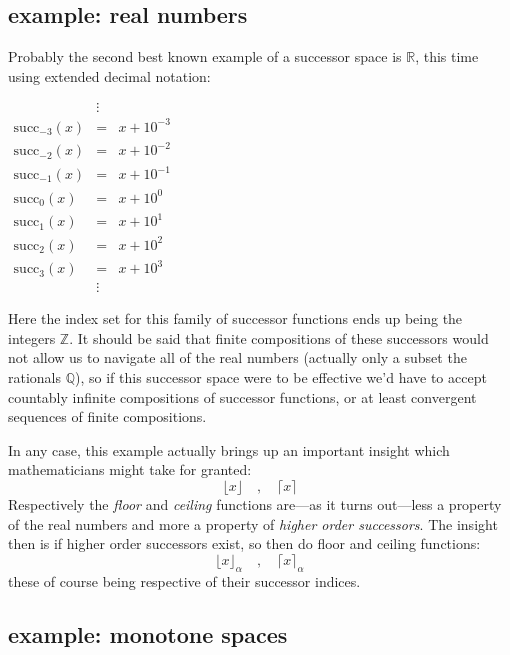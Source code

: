 \documentclass[twoside]{article}
\begin{document}
\subsection*{example: real numbers}

Probably the second best known example of a successor space is $ \mathbb{R} $, this time using extended decimal notation:

\begin{center}
$ \begin{array}{rcl}
			& \vdots	&			\\
\mbox{succ}_{-3}(x)	& =		& x + 10^{-3}		\\
\mbox{succ}_{-2}(x)	& =		& x + 10^{-2}		\\
\mbox{succ}_{-1}(x)	& =		& x + 10^{-1}		\\
\mbox{succ}_0(x)	& =		& x + 10^0		\\
\mbox{succ}_1(x)	& =		& x + 10^1		\\
\mbox{succ}_2(x)	& =		& x + 10^2		\\
\mbox{succ}_3(x)	& =		& x + 10^3		\\
			& \vdots	&
\end{array} $
\end{center}

Here the index set for this family of successor functions ends up being the integers $ \mathbb{Z} $. It should be said
that finite compositions of these successors would not allow us to navigate all of the real numbers (actually only
a subset the rationals $ \mathbb{Q} $), so if this successor space were to be effective we'd have to accept countably
infinite compositions of successor functions, or at least convergent sequences of finite compositions.

\newpage

In any case, this example actually brings up an important insight which mathematicians might take for granted:
$$ \lfloor x\rfloor\quad,\quad\lceil x\rceil $$
Respectively the \emph{floor} and \emph{ceiling} functions are---as it turns out---less a property of the real numbers
and more a property of \emph{higher order successors}. The insight then is if higher order successors exist, so then
do floor and ceiling functions:
$$ \lfloor x\rfloor_\alpha\quad,\quad\lceil x\rceil_\alpha $$
these of course being respective of their successor indices.

\subsection*{example: monotone spaces}
\end{document}

